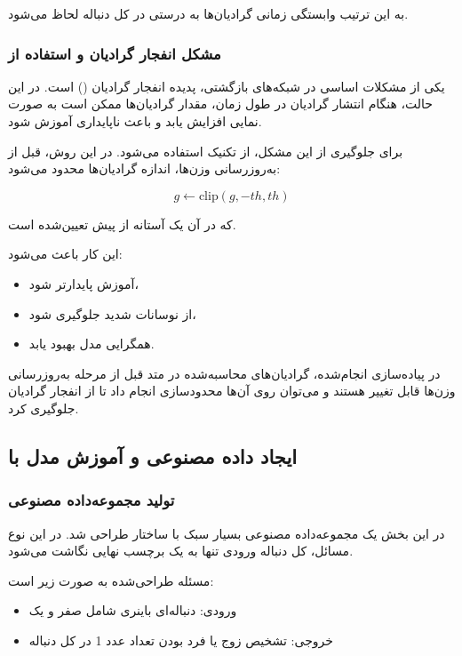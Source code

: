 \documentclass{article}
\begin{document}
به این ترتیب وابستگی زمانی گرادیان‌ها به درستی در کل دنباله لحاظ می‌شود.

\subsubsection{مشکل انفجار گرادیان و استفاده از }

یکی از مشکلات اساسی در شبکه‌های بازگشتی، پدیده انفجار گرادیان () است. در این حالت، هنگام انتشار گرادیان در طول زمان، مقدار گرادیان‌ها ممکن است به صورت نمایی افزایش یابد و باعث ناپایداری آموزش شود.

برای جلوگیری از این مشکل، از تکنیک  استفاده می‌شود. در این روش، قبل از به‌روزرسانی وزن‌ها، اندازه گرادیان‌ها محدود می‌شود:

\[
g \leftarrow \text{clip}(g, -th, th)
\]

که در آن  یک آستانه از پیش تعیین‌شده است.

این کار باعث می‌شود:

\begin{itemize}
	\item آموزش پایدارتر شود،
	\item از نوسانات شدید جلوگیری شود،
	\item همگرایی مدل بهبود یابد.
\end{itemize}

در پیاده‌سازی انجام‌شده، گرادیان‌های محاسبه‌شده در متد  قبل از مرحله به‌روزرسانی وزن‌ها قابل تغییر هستند و می‌توان روی آن‌ها محدودسازی انجام داد تا از انفجار گرادیان جلوگیری کرد.
\subsection{ایجاد داده مصنوعی  و آموزش مدل با }

\subsubsection{تولید مجموعه‌داده مصنوعی}

در این بخش یک مجموعه‌داده مصنوعی بسیار سبک با ساختار  طراحی شد. در این نوع مسائل، کل دنباله ورودی تنها به یک برچسب نهایی نگاشت می‌شود.  

مسئله طراحی‌شده به صورت زیر است:

\begin{itemize}
	\item ورودی: دنباله‌ای باینری شامل صفر و یک
	\item خروجی: تشخیص زوج یا فرد بودن تعداد عدد 1 در کل دنباله
\end{itemize}
\end{document}
